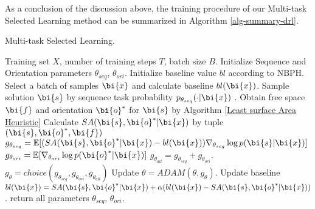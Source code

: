 As a conclusion of the discussion above, the training procedure of our Multi-task Selected Learning method can be summarized in Algorithm \ref{alg-summary-drl}.

\begin{algorithm}                  %
	\caption{Multi-task Selected Learning.}       
	\label{alg-summary-drl} 
	\begin{algorithmic}[1]
		\State Training set $X$, number of training steps $T$, batch size $B$.
		\State Initialize Sequence and Orientation parameters $\theta_{seq}$, $\theta_{ori}$.
		\State Initialize baseline value $bl$ according to NBPH.
		\State Select a batch of samples $\bi{x}$ and calculate baseline $bl(\bi{x})$.
		\State Sample solution $\bi{s}$ by sequence task probability $p_{\theta_{seq}}(\cdot|\bi{x})$ .
		\State Obtain free space $\bi{f}$ and orientation $\bi{o}^{*}$ for $\bi{s}$ by Algorithm \ref{Least surface Area Heuristic}
		\State Calculate $SA(\bi{s},\bi{o}^{*}|\bi{x})$ by tuple $(\bi{s},\bi{o}^{*},\bi{f})$
		\State %
		$g_{\theta_{seq}}=\mathbb{E}[(SA(\bi{s}, \bi{o}^{*}|\bi{x})-bl(\bi{x}))\nabla_{\theta_{seq}}\log{p(\bi{s}|\bi{x})}]$
		\State  %
		$g_{\theta_{ori}}=\mathbb{E}[\nabla_{\theta_{ori}}\log{p(\bi{o}^{*}|\bi{x})}]$
		\State 	$g_{\theta_{all}}= g_{\theta_{seq}}+g_{\theta_{ori}}$.
		\State  $g_{\theta} = choice(g_{\theta_{seq}},g_{\theta_{ori}},g_{\theta_{all}})$
		\State Update $\theta = ADAM(\theta, g_{\theta})$.
		\State Update baseline $bl(\bi{x}) = SA(\bi{s},\bi{o}^{*}|\bi{x}) + \alpha(bl(\bi{x})-SA(\bi{s},\bi{o}^{*}|\bi{x}))$.
		\EndFor
		\State return all parameters $\theta_{seq}$, $\theta_{ori}$.
	\end{algorithmic}
\end{algorithm}


